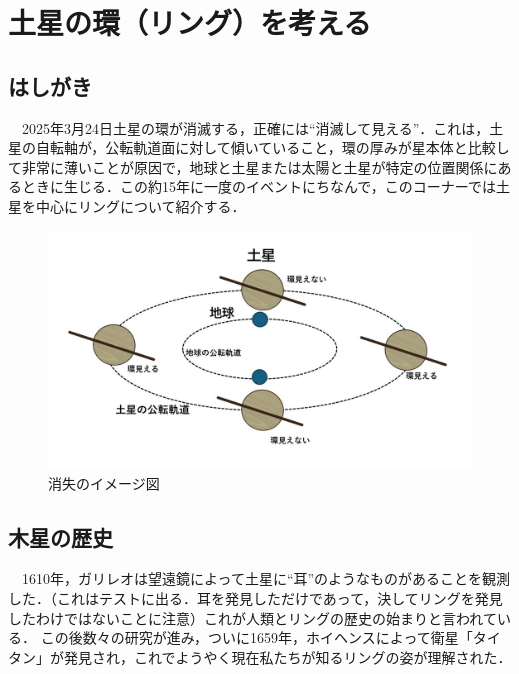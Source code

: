 \documentclass[../main]{subfiles}
\begin{document}
\chapter{土星の環（リング）を考える} %

\section{はしがき}
　2025年3月24日土星の環が消滅する，正確には``消滅して見える''．これは，土星の自転軸が，公転軌道面に対して傾いていること，環の厚みが星本体と比較して非常に薄いことが原因で，地球と土星または太陽と土星が特定の位置関係にあるときに生じる．この約15年に一度のイベントにちなんで，このコーナーでは土星を中心にリングについて紹介する．
\begin{figure}[htbp]
    \centering
    \includegraphics[width=14cm]{sections/kurahara/部誌用/スライド3.JPG}
    \caption{消失のイメージ図}
\end{figure}

\section{木星の歴史}
　1610年，ガリレオは望遠鏡によって土星に``耳''のようなものがあることを観測した．（これはテストに出る．耳を発見しただけであって，決してリングを発見したわけではないことに注意）これが人類とリングの歴史の始まりと言われている．
この後数々の研究が進み，ついに1659年，ホイヘンスによって衛星「タイタン」が発見され，これでようやく現在私たちが知るリングの姿が理解された．
\end{document}
